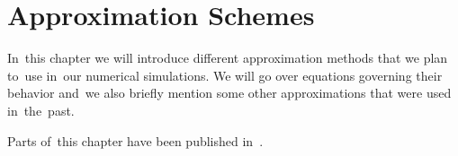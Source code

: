 \chapter{Approximation Schemes}
\label{chpt:app_schemes}
In~this chapter we will introduce different approximation methods that we plan to~use in~our numerical simulations. We will go over equations governing their behavior and~we also briefly mention some other approximations that were used in~the~past.

Parts of~this chapter have been published in~\textcite{2020MNRAS.493.2085V}.





